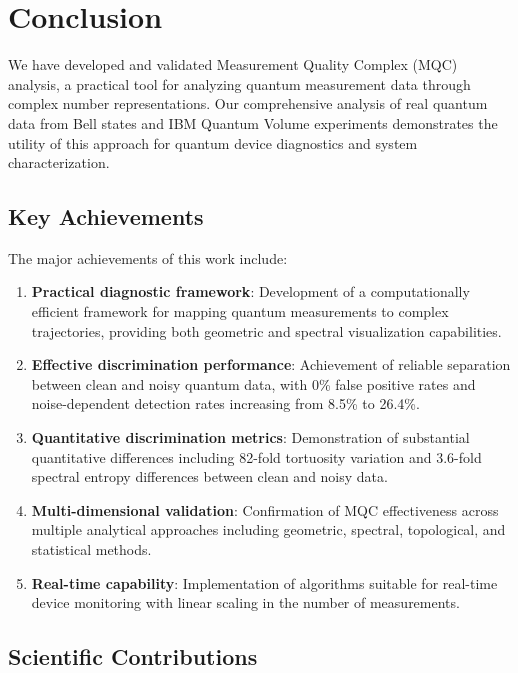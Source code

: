 \section{Conclusion}
\label{sec:conclusion}

We have developed and validated Measurement Quality Complex (MQC) analysis, a practical tool for analyzing quantum measurement data through complex number representations. Our comprehensive analysis of real quantum data from Bell states and IBM Quantum Volume experiments demonstrates the utility of this approach for quantum device diagnostics and system characterization.

\subsection{Key Achievements}

The major achievements of this work include:

\begin{enumerate}
\item \textbf{Practical diagnostic framework}: Development of a computationally efficient framework for mapping quantum measurements to complex trajectories, providing both geometric and spectral visualization capabilities.

\item \textbf{Effective discrimination performance}: Achievement of reliable separation between clean and noisy quantum data, with 0\% false positive rates and noise-dependent detection rates increasing from 8.5\% to 26.4\%.

\item \textbf{Quantitative discrimination metrics}: Demonstration of substantial quantitative differences including 82-fold tortuosity variation and 3.6-fold spectral entropy differences between clean and noisy data.

\item \textbf{Multi-dimensional validation}: Confirmation of MQC effectiveness across multiple analytical approaches including geometric, spectral, topological, and statistical methods.

\item \textbf{Real-time capability}: Implementation of algorithms suitable for real-time device monitoring with linear scaling in the number of measurements.
\end{enumerate}

\subsection{Scientific Contributions}

